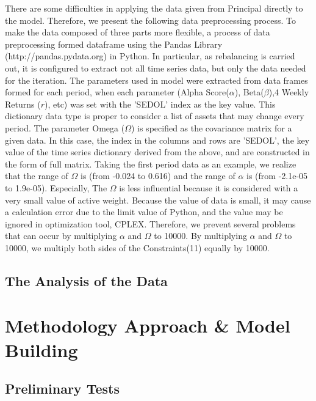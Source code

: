\documentclass[11pt]{article}
\begin{document}
	There are some difficulties in applying the data given from Principal directly to the model. Therefore, we present the following data preprocessing process. To make the data composed of three parts more flexible, a process of data preprocessing formed dataframe using the Pandas Library (http://pandas.pydata.org) in Python. In particular, as rebalancing is carried out, it is configured to extract not all time series data, but only the data needed for the iteration. The parameters used in model were extracted from data frames formed for each period, when each parameter (Alpha Score($\alpha$), Beta($\beta$),4 Weekly Returns ($r$), etc) was set with the 'SEDOL' index as the key value. This dictionary data type is proper to consider a list of assets that may change every period. The parameter Omega ($ \Omega $) is specified as the covariance matrix for a given data. In this case, the index in the columns and rows are 'SEDOL', the key value of the time series dictionary derived from the above, and are constructed in the form of full matrix. Taking the first period data as an example, we realize that the range of $\Omega$ is (from -0.024 to 0.616) and the range of $\alpha$ is (from -2.1e-05 to 1.9e-05). Especially, The $\Omega$ is less influential because it is considered with a very small value of active weight. Because the value of data is small, it may cause a calculation error due to the limit value of Python, and the value may be ignored in optimization tool, CPLEX. Therefore, we prevent several problems that can occur by multiplying $\alpha$ and $\Omega$ to 10000. By multiplying $\alpha$ and $\Omega$ to 10000, we multiply both sides of the Constraints(11) equally by 10000. 
	
	
	\subsection{The Analysis of the Data}
	
	
	\section*{Methodology Approach {\&} Model Building}
	\setcounter{subsection}{0}
	
	
	\subsection{Preliminary Tests}
	
\end{document}
